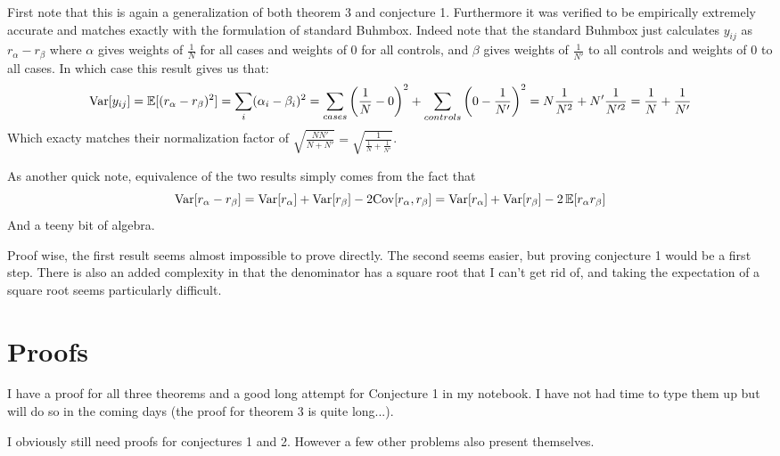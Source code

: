 \documentclass[11pt]{hw-template}
\begin{document}
  \begin{remark}
    First note that this is again a generalization of both theorem 3 and conjecture 1. Furthermore it was verified to be empirically extremely accurate and matches exactly with the formulation of standard Buhmbox.
    Indeed note that the standard Buhmbox just calculates $y_{ij}$ as $r_\alpha - r_\beta$ where $\alpha$ gives weights of $\frac{1}{N}$ for all cases and weights of 0 for all controls, and $\beta$ gives weights
    of $\frac{1}{N'}$ to all controls and weights of 0 to all cases. In which case this result gives us that:
    $$\operatorname{Var}[y_{ij}] = \operatorname{\mathbb{E}}[(r_\alpha - r_\beta)^2] = \sum_i (\alpha_i - \beta_i)^2 = \sum_{cases} \left(\frac{1}{N} - 0\right)^2 + \sum_{controls} \left(0 - \frac{1}{N'}\right)^2 = N\frac{1}{N^2} + N' \frac{1}{N'^2} = \frac{1}{N} + \frac{1}{N'}$$ 
    Which exacty matches their normalization factor of $\sqrt{\frac{NN'}{N+N'}} = \sqrt{\frac{1}{\frac{1}{N} + \frac{1}{N'}}}$.
    
    \bigskip
    
    As another quick note, equivalence of the two results simply comes from the fact that
    $$\operatorname{Var}[r_\alpha - r_\beta] = \operatorname{Var}[r_\alpha] + \operatorname{Var}[r_\beta] -2\text{Cov}[r_\alpha, r_\beta] = \operatorname{Var}[r_\alpha] + \operatorname{Var}[r_\beta] -2\operatorname{\mathbb{E}}[r_\alpha r_\beta]$$
    And a teeny bit of algebra.
    
    \bigskip
    
    Proof wise, the first result seems almost impossible to prove directly. The second seems easier, but proving conjecture 1 would be a first step. There is also an added complexity in that the denominator has
    a square root that I can't get rid of, and taking the expectation of a square root seems particularly difficult.
    
  \end{remark}

\section*{Proofs}

  I have a proof for all three theorems and a good long attempt for Conjecture 1 in my notebook. I have not had time to type them up but will do so in the coming days (the proof for theorem 3 is
  quite long...).


  I obviously still need proofs for conjectures 1 and 2. However a few other problems also present themselves.
\end{document}
